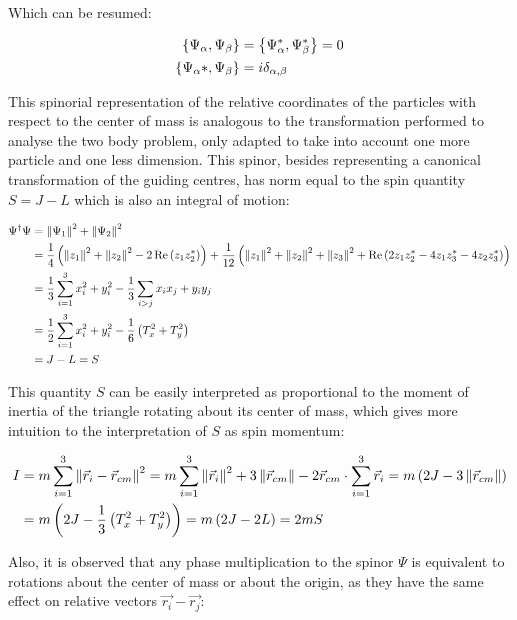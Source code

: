 Which can be resumed:

\begin{align*}
\left\lbrace \Psi_\alpha, \Psi_\beta \right\rbrace &= \left\lbrace \Psi_\alpha^*, \Psi_\beta^* \right\rbrace = 0\\
\left\lbrace \Psi_\alpha*, \Psi_\beta \right\rbrace &= i\delta_{\alpha,\beta}
\end{align*}

This spinorial representation of the relative coordinates of the particles with respect to the center of mass is analogous to the transformation performed to analyse the two body problem, only adapted to take into account one more particle and one less dimension. This spinor, besides representing a canonical transformation of the guiding centres, has norm equal to the spin quantity $S = J-L$ which is also an integral of motion:

\small
\begin{align*}
\Psi^\dagger\Psi &= \left\lVert \Psi_1 \right\rVert^2 + \left\lVert \Psi_2 \right\rVert^2 \\
&= \frac{1}{4}\left( \left\lVert z_1 \right\rVert^2 + \left\lVert z_2 \right\rVert^2 - 2\operatorname{Re}\left( z_1z_2^* \right) \right) + \frac{1}{12}\left( \left\lVert z_1 \right\rVert^2 + \left\lVert z_2 \right\rVert^2+ \left\lVert z_3 \right\rVert^2 + \operatorname{Re}\left( 2z_1z_2^*- 4z_1z_3^*- 4z_2z_3^* \right) \right)\\
&= \frac{1}{3}\sum_{i=1}^3 x_i^2 + y_i^2 -\frac{1}{3}\sum_{i > j} x_ix_j + y_iy_j\\
&= \frac{1}{2}\sum_{i=1}^3 x_i^2 + y_i^2 - \frac{1}{6}\left( T_x^2+T_y^2 \right)\\
&= J-L = S
\end{align*}
\normalsize

This quantity $S$ can be easily interpreted as proportional to the moment of inertia of the triangle rotating about its center of mass, which gives more intuition to the interpretation of $S$ as spin momentum:

\begin{align*}
I &= m\sum_{i=1}^3 \left\lVert \vec{r}_i - \vec{r}_{cm} \right\rVert^2 = m\sum_{i=1}^3 \left\lVert \vec{r}_i \right\rVert^2 + 3\left\lVert \vec{r}_{cm} \right\rVert - 2\vec{r}_{cm}\cdot\sum_{i=1}^3\vec{r}_i =m\left( 2J -3\left\lVert \vec{r}_{cm} \right\rVert \right)\\
&= m\left( 2J - \frac{1}{3}\left( T_x^2+T_y^2 \right) \right) = m\left( 2J-2L \right) = 2mS
\end{align*}

Also, it is observed that any phase multiplication to the spinor $\Psi$ is equivalent to rotations about the center of mass or about the origin, as they have the same effect on relative vectors $\vec{r_i}-\vec{r_j}$:

